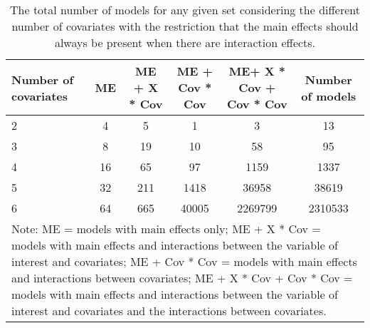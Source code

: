 \begin{table}[!h]
\centering
\caption{The total number of models for any given set considering the different number of covariates with the restriction that the main effects should always be present when there are interaction effects.} 
\begin{tabular}{lccccc}
  \hline
Number of covariates & ME & ME + X * Cov & ME + Cov * Cov & ME+ X * Cov + Cov * Cov & Number of models \\ 
  \hline
2 & 4 & 5 & 1 & 3 & 13 \\ 
  3 & 8 & 19 & 10 & 58 & 95 \\ 
  4 & 16 & 65 & 97 & 1159 & 1337 \\ 
  5 & 32 & 211 & 1418 & 36958 & 38619 \\ 
  6 & 64 & 665 & 40005 & 2269799 & 2310533 \\ 
   \hline 
\multicolumn{6}{p{16cm}}{\footnotesize{Note: ME = models with main effects only; ME + X * Cov = models with main effects and interactions between the variable of interest and covariates; ME + Cov * Cov = models with main effects and interactions between covariates; ME + X * Cov + Cov * Cov = models with main effects and interactions between the variable of interest and covariates and the interactions between covariates.}} 
 \hline
\end{tabular}
\end{table}
